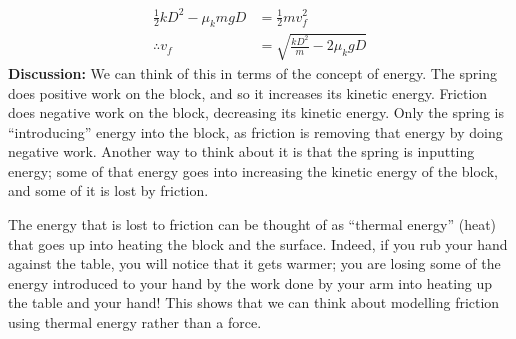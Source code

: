 \begin{example}
\begin{align*}
\frac{1}{2}kD^2-\mu_kmgD  &=\frac{1}{2}mv_f^2\\
\therefore v_f &=\sqrt{\frac{kD^2}{m}-2\mu_kgD}
\end{align*}
\textbf{Discussion:} We can think of this in terms of the concept of energy. The spring does positive work on the block, and so it increases its kinetic energy. Friction does negative work on the block, decreasing its kinetic energy. Only the spring is ``introducing'' energy into the block, as friction is removing that energy by doing negative work. Another way to think about it is that the spring is inputting energy; some of that energy goes into increasing the kinetic energy of the block, and some of it is lost by friction.

The energy that is lost to friction can be thought of as ``thermal energy'' (heat) that goes up into heating the block and the surface. Indeed, if you rub your hand against the table, you will notice that it gets warmer; you are losing some of the energy introduced to your hand by the work done by your arm into heating up the table and your hand! This shows that we can think about modelling friction using thermal energy rather than a force.
\end{example}

